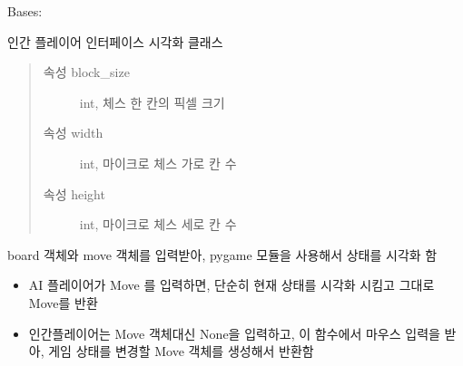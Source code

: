 \documentclass[letterpaper,10pt,english]{sphinxmanual}
\begin{document}
\begin{fulllineitems}
\label{\detokenize{scripts:scripts.chess_board.ChessBoard}}
Bases: 

인간 플레이어 인터페이스 시각화 클래스
\begin{quote}\begin{description}
\item[{속성 block\_size}] \leavevmode
int, 체스 한 칸의 픽셀 크기

\item[{속성 width}] \leavevmode
int, 마이크로 체스 가로 칸 수

\item[{속성 height}] \leavevmode
int, 마이크로 체스 세로 칸 수

\end{description}\end{quote}

\begin{fulllineitems}
\label{\detokenize{scripts:scripts.chess_board.ChessBoard.block_size}}
\end{fulllineitems}


\begin{fulllineitems}
\label{\detokenize{scripts:scripts.chess_board.ChessBoard.height}}
\end{fulllineitems}


\begin{fulllineitems}
\label{\detokenize{scripts:scripts.chess_board.ChessBoard.step}}
board 객체와 move 객체를 입력받아,
pygame 모듈을 사용해서 상태를 시각화 함
\begin{itemize}
\item {} 
AI 플레이어가 Move 를 입력하면, 단순히 현재 상태를 시각화 시킴고 그대로 Move를 반환

\item {} 
인간플레이어는 Move 객체대신 None을 입력하고, 이 함수에서 마우스 입력을 받아, 
게임 상태를 변경할 Move 객체를 생성해서 반환함


\end{itemize}
\end{fulllineitems}
\end{fulllineitems}
\end{document}
